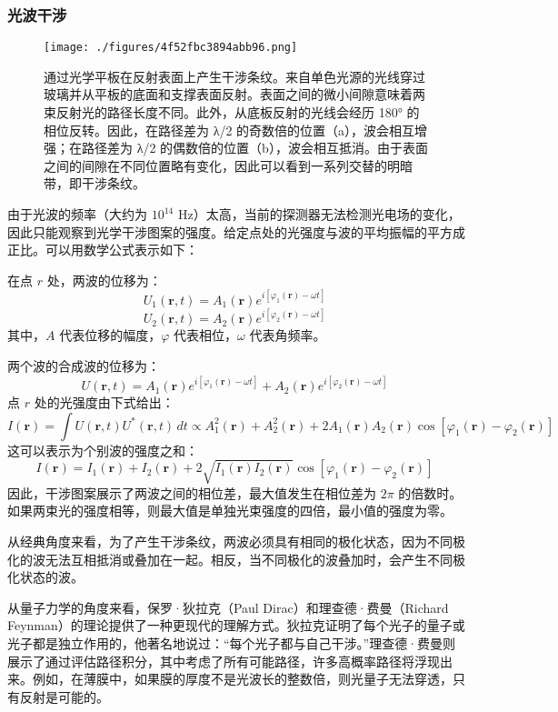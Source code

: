\subsubsection{光波干涉}
\begin{figure}[ht]
\centering
\texttt{[image: ./figures/4f52fbc3894abb96.png]}
\caption{通过光学平板在反射表面上产生干涉条纹。来自单色光源的光线穿过玻璃并从平板的底面和支撑表面反射。表面之间的微小间隙意味着两束反射光的路径长度不同。此外，从底板反射的光线会经历 180° 的相位反转。因此，在路径差为 λ/2 的奇数倍的位置（a），波会相互增强；在路径差为 λ/2 的偶数倍的位置（b），波会相互抵消。由于表面之间的间隙在不同位置略有变化，因此可以看到一系列交替的明暗带，即干涉条纹。} \label{fig_GSWLX_9}
\end{figure}
由于光波的频率（大约为 \(10^{14}\) Hz）太高，当前的探测器无法检测光电场的变化，因此只能观察到光学干涉图案的强度。给定点处的光强度与波的平均振幅的平方成正比。可以用数学公式表示如下：

在点 \(r\) 处，两波的位移为：
\[
U_1(\mathbf{r}, t) = A_1(\mathbf{r}) e^{i[\varphi_1(\mathbf{r}) - \omega t]}~
\]
\[
U_2(\mathbf{r}, t) = A_2(\mathbf{r}) e^{i[\varphi_2(\mathbf{r}) - \omega t]}~
\]
其中，\(A\) 代表位移的幅度，\(\varphi\) 代表相位，\(\omega\) 代表角频率。

两个波的合成波的位移为：
\[
U(\mathbf{r}, t) = A_1(\mathbf{r}) e^{i[\varphi_1(\mathbf{r}) - \omega t]} + A_2(\mathbf{r}) e^{i[\varphi_2(\mathbf{r}) - \omega t]}~
\]
点 \(r\) 处的光强度由下式给出：
\[
I(\mathbf{r}) = \int U(\mathbf{r}, t) U^*(\mathbf{r}, t)\, dt \propto A_1^2(\mathbf{r}) + A_2^2(\mathbf{r}) + 2A_1(\mathbf{r}) A_2(\mathbf{r}) \cos[\varphi_1(\mathbf{r}) - \varphi_2(\mathbf{r})]~
\]
这可以表示为个别波的强度之和：
\[
I(\mathbf{r}) = I_1(\mathbf{r}) + I_2(\mathbf{r}) + 2 \sqrt{I_1(\mathbf{r}) I_2(\mathbf{r})} \cos[\varphi_1(\mathbf{r}) - \varphi_2(\mathbf{r})]~
\]
因此，干涉图案展示了两波之间的相位差，最大值发生在相位差为 \(2\pi\) 的倍数时。如果两束光的强度相等，则最大值是单独光束强度的四倍，最小值的强度为零。

从经典角度来看，为了产生干涉条纹，两波必须具有相同的极化状态，因为不同极化的波无法互相抵消或叠加在一起。相反，当不同极化的波叠加时，会产生不同极化状态的波。

从量子力学的角度来看，保罗·狄拉克（Paul Dirac）和理查德·费曼（Richard Feynman）的理论提供了一种更现代的理解方式。狄拉克证明了每个光子的量子或光子都是独立作用的，他著名地说过：“每个光子都与自己干涉。”理查德·费曼则展示了通过评估路径积分，其中考虑了所有可能路径，许多高概率路径将浮现出来。例如，在薄膜中，如果膜的厚度不是光波长的整数倍，则光量子无法穿透，只有反射是可能的。